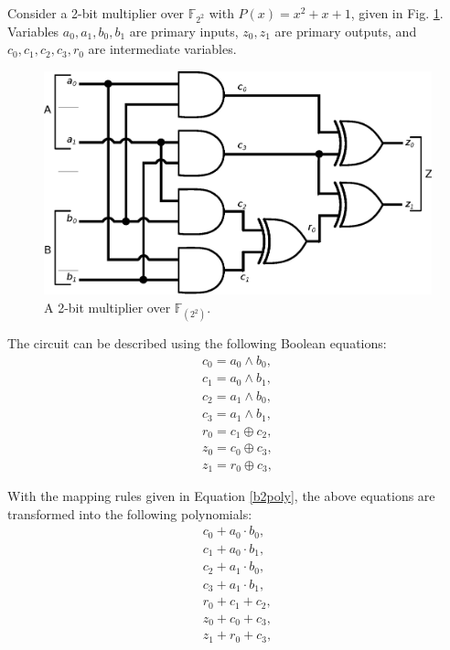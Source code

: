 \begin{Example}
\label{exp:mul2bit}
Consider a 2-bit multiplier over ${\mathbb{F}}_{2^2}$ with
$P(x)=x^{2}+x+1$, given in Fig. \ref{fig:2bitmul}. Variables $a_0,
a_1, b_0, b_1$ are primary inputs, $z_0, z_1$ are primary outputs, and
$c_0, c_1, c_2, c_3, r_0$ are intermediate variables. 

\begin{figure}[H]
\centerline{
\includegraphics[scale=0.4]{./figures/2bitmasmult.eps}
}
\caption{ A 2-bit multiplier over ${\mathbb{F}}_(2^2)$.}
\label{fig:2bitmul}
\end{figure}

The circuit can be described using the following Boolean equations:
\begin{align*}
c_0=a_0 \wedge b_0,   \nonumber \\
c_1=a_0 \wedge b_1,   \nonumber \\
c_2=a_1 \wedge b_0, \nonumber \\
c_3=a_1 \wedge b_1,   \nonumber \\
r_0=c_1 \oplus c_2 ,      \nonumber \\
z_0=c_0 \oplus c_3,   \nonumber \\
z_1=r_0 \oplus c_3,    \nonumber
\end{align*}

With the mapping rules given in Equation \ref{b2poly}, 
the above equations are transformed into the following polynomials:
\begin{align*}
c_0+a_0 \cdot b_0,   \nonumber \\
c_1+a_0 \cdot b_1,   \nonumber \\
c_2+a_1 \cdot b_0,   \nonumber \\
c_3+a_1 \cdot b_1,   \nonumber \\
r_0+c_1 + c_2 ,      \nonumber \\
z_0+c_0 + c_3,   \nonumber \\
z_1+r_0 + c_3,   \nonumber
\end{align*}


\end{Example}
